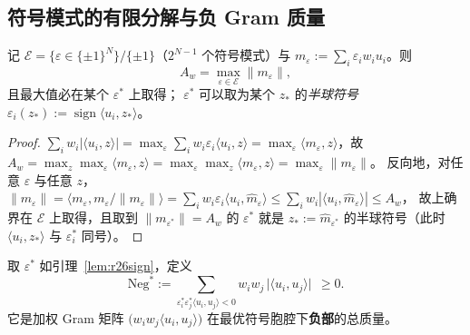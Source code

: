 \subsection{符号模式的有限分解与负 Gram 质量}\label{sec:r26:neg}

\begin{lemma}[偶极子的符号模式分解]\label{lem:r26sign}
记 $\mathcal{E}=\{\varepsilon\in\{\pm1\}^N\}/\{\pm1\}$（$2^{N-1}$ 个符号模式）与
$m_\varepsilon:=\sum_i\varepsilon_iw_iu_i$。则
\begin{equation}\label{eq:r26sign}
A_w=\max_{\varepsilon\in\mathcal{E}}\|m_\varepsilon\| ,
\end{equation}
且最大值必在某个 $\varepsilon^*$ 上取得；
$\varepsilon^*$ 可以取为某个 $z_*$ 的\emph{半球符号}
$\varepsilon_i(z_*):=\operatorname{sign}\langle u_i,z_*\rangle$。
\end{lemma}

\begin{proof}
$\sum_iw_i|\langle u_i,z\rangle|=\max_\varepsilon\sum_iw_i\varepsilon_i\langle u_i,z\rangle
=\max_\varepsilon\langle m_\varepsilon,z\rangle$，故
$A_w=\max_z\max_\varepsilon\langle m_\varepsilon,z\rangle
=\max_\varepsilon\max_z\langle m_\varepsilon,z\rangle=\max_\varepsilon\|m_\varepsilon\|$。
反向地，对任意 $\varepsilon$ 与任意 $z$，
$\|m_\varepsilon\|=\langle m_\varepsilon,m_\varepsilon/\|m_\varepsilon\|\rangle
=\sum_iw_i\varepsilon_i\langle u_i,\hat m_\varepsilon\rangle
\le\sum_iw_i|\langle u_i,\hat m_\varepsilon\rangle|\le A_w$，
故上确界在 $\mathcal{E}$ 上取得，且取到 $\|m_{\varepsilon^*}\|=A_w$ 的 $\varepsilon^*$
就是 $z_*:=\hat m_{\varepsilon^*}$ 的半球符号（此时 $\langle u_i,z_*\rangle$ 与 $\varepsilon_i^*$ 同号）。
\end{proof}

\begin{definition}[负 Gram 质量]\label{def:r26neg}
取 $\varepsilon^*$ 如引理~\ref{lem:r26sign}，定义
\begin{equation}\label{eq:r26negdef}
\mathrm{Neg}^*:=\sum_{\varepsilon_i^*\varepsilon_j^*\langle u_i,u_j\rangle<0}
w_iw_j\,\bigl|\langle u_i,u_j\rangle\bigr|\ \ \ge0 .
\end{equation}
它是加权 Gram 矩阵 $\bigl(w_iw_j\langle u_i,u_j\rangle\bigr)$
在最优符号胞腔下\textbf{负部}的总质量。
\end{definition}

